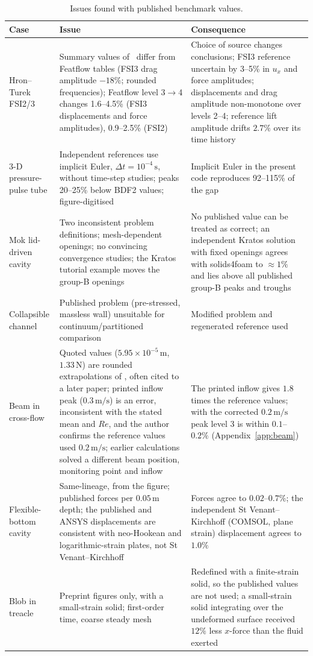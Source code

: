 \begin{table}[htbp]
	\centering
	\footnotesize
	\setlength{\tabcolsep}{3pt}
	\caption{Issues found with published benchmark values.}
	\label{tab:published}
	\begin{tabular}{p{2.8cm}p{5.8cm}p{5.0cm}}
		\toprule
		Case & Issue & Consequence \\
		\midrule
		Hron--Turek FSI2/3 & Summary values of~\citet{Turek2006} differ from Featflow tables (FSI3 drag amplitude $-18\%$; rounded frequencies); Featflow level 3$\to$4 changes 1.6--4.5\% (FSI3 displacements and force amplitudes), 0.9--2.5\% (FSI2) & Choice of source changes conclusions; FSI3 reference uncertain by 3--5\% in $u_x$ and force amplitudes; displacements and drag amplitude non-monotone over levels 2--4; reference lift amplitude drifts $2.7\%$ over its time history \\
		3-D pressure-pulse tube & Independent references use implicit Euler, $\Delta t = 10^{-4}\,\mathrm{s}$, without time-step studies; peaks 20--25\% below BDF2 values; figure-digitised & Implicit Euler in the present code reproduces 92--115\% of the gap \\
		Mok lid-driven cavity & Two inconsistent problem definitions; mesh-dependent openings; no convincing convergence studies; the Kratos tutorial example moves the group-B openings & No published value can be treated as correct; an independent Kratos solution with fixed openings agrees with solids4foam to $\approx1\%$ and lies above all published group-B peaks and troughs \\
		Collapsible channel & Published problem (pre-stressed, massless wall) unsuitable for continuum/partitioned comparison & Modified problem and regenerated reference used \\
		Beam in cross-flow & Quoted values ($5.95\times10^{-5}\,\mathrm{m}$, $1.33\,\mathrm{N}$) are rounded extrapolations of \citet{Richter2012}, often cited to a later paper; printed inflow peak ($0.3\,\mathrm{m/s}$) is an error, inconsistent with the stated mean and $Re$, and the author confirms the reference values used $0.2\,\mathrm{m/s}$; earlier calculations solved a different beam position, monitoring point and inflow & The printed inflow gives $1.8$ times the reference values; with the corrected $0.2\,\mathrm{m/s}$ peak level 3 is within $0.1$--$0.2\%$ (Appendix~\ref{app:beam}) \\
		Flexible-bottom cavity & Same-lineage, from the figure; published forces per $0.05\,\mathrm{m}$ depth; the published and ANSYS displacements are consistent with neo-Hookean and logarithmic-strain plates, not St Venant--Kirchhoff & Forces agree to $0.02$--$0.7\%$; the independent St Venant--Kirchhoff (COMSOL, plane strain) displacement agrees to $1.0\%$ \\
		Blob in treacle & Preprint figures only, with a small-strain solid; first-order time, coarse steady mesh & Redefined with a finite-strain solid, so the published values are not used; a small-strain solid integrating over the undeformed surface received $12\%$ less $x$-force than the fluid exerted \\
		\bottomrule
	\end{tabular}
\end{table}

